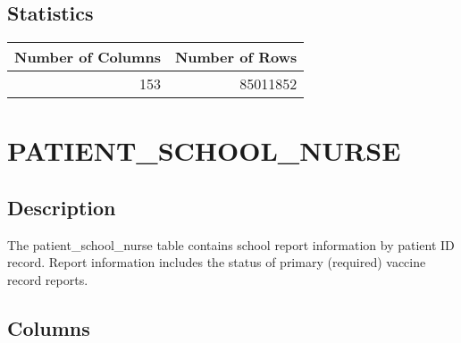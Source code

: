 \documentclass[
  letterpaper,
  DIV=11,
  numbers=noendperiod]{scrreprt}
\begin{document}
\hypertarget{statistics-29}{%
\section*{Statistics}\label{statistics-29}}

\begin{longtable}{rr}
\toprule
Number of Columns & Number of Rows \\ 
\midrule
153 & 85011852 \\ 
\bottomrule
\end{longtable}

\hypertarget{patient_school_nurse}{%
\chapter*{PATIENT\_SCHOOL\_NURSE}\label{patient_school_nurse}}

\hypertarget{description-30}{%
\section*{Description}\label{description-30}}

The patient\_school\_nurse table contains school report information by
patient ID record. Report information includes the status of primary
(required) vaccine record reports.

\hypertarget{columns-30}{%
\section*{Columns}\label{columns-30}}
\end{document}
